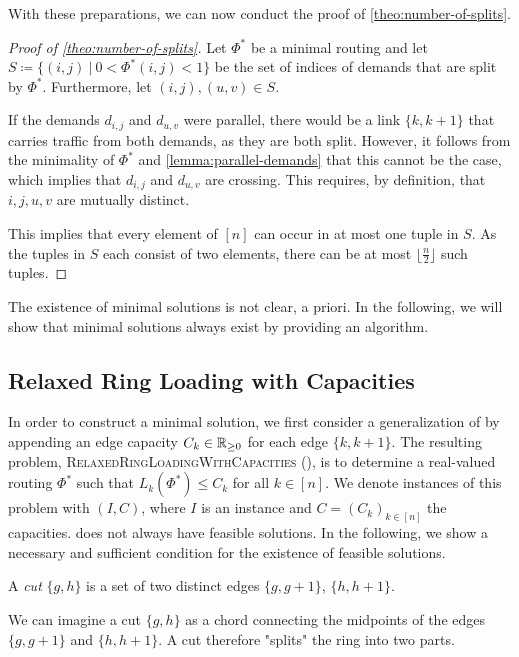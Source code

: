With these preparations, we can now conduct the proof of \cref{theo:number-of-splits}.
\begin{proof}[Proof of \cref{theo:number-of-splits}]
	Let $\Phi^\ast$ be a minimal routing and let $S \coloneqq \{(i, j)\ |\ 0 < \Phi^\ast(i, j) < 1\}$ be the set of indices of demands that are split by $\Phi^\ast$.
	Furthermore, let $(i, j), (u, v) \in S$.
	
	If the demands $d_{i,j}$ and $d_{u, v}$ were parallel, there would be a link $\{k, k+1\}$ that carries traffic from both demands, as they are both split.
	However, it follows from the minimality of $\Phi^\ast$ and \cref{lemma:parallel-demands} that this cannot be the case, which implies that $d_{i,j}$ and $d_{u, v}$ are crossing.
	This requires, by definition, that $i, j, u, v$ are mutually distinct.
	
	This implies that every element of $[n]$ can occur in at most one tuple in $S$.
	As the tuples in $S$ each consist of two elements, there can be at most $\lfloor\frac{n}{2}\rfloor$ such tuples.
\end{proof}

The existence of minimal solutions is not clear, a priori.
In the following, we will show that minimal solutions always exist by providing an algorithm.

\subsection{Relaxed Ring Loading with Capacities}

In order to construct a minimal solution, we first consider a generalization of \RRL by appending an edge capacity $C_k \in \mathbb{R}_{\geq 0}$ for each edge $\{k, k+1\}$.
The resulting problem, \textsc{RelaxedRingLoadingWithCapacities} (\RRLWC), is to determine a real-valued routing $\Phi^\ast$ such that $L_k(\Phi^\ast) \leq C_k$ for all $k \in [n]$.
We denote instances of this problem with $(I, C)$, where $I$ is an \RRL instance and $C = (C_k)_{k \in [n]}$ the capacities.
\RRLWC does not always have feasible solutions.
In the following, we show a necessary and sufficient condition for the existence of feasible solutions.

\begin{definition}
	A \emph{cut} $\{g, h\}$ is a set of two distinct edges $\{g, g+1\}$, $\{h, h+1\}$.
\end{definition}

We can imagine a cut $\{g, h\}$ as a chord connecting the midpoints of the edges $\{g, g+1\}$ and $\{h, h+1\}$.
A cut therefore "splits" the ring into two parts.

